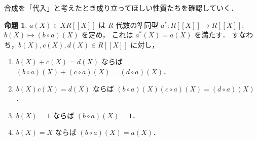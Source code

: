 \documentclass{jsarticle}
\newcommand{\longto}{\longrightarrow}
\theoremstyle{definition}
\newtheorem{Prp}{命題}
\newenvironment{prp}{\vspace{1ex}\begin{screen}\begin{Prp}}{\end{Prp}\end{screen}}
\begin{document}
合成を「代入」と考えたとき成り立ってほしい性質たちを確認していく．

\begin{prp}
  \label{prp:composition-hom}
  $a(X) \in X R[[X]]$ は $R$ 代数の準同型 $a^*\colon R[[X]] \longto R[[X]]$; $b(X) \longmapsto (b \circ a)(X)$ を定め，
  これは $a^*(X) = a(X)$ を満たす．
  すなわち，$b(X), c(X), d(X) \in R[[X]]$ に対し，
  \begin{enumerate}[(1)]
    \item $b(X) + c(X) = d(X)$ ならば $(b \circ a)(X) + (c \circ a)(X) = (d \circ a)(X)$．
    \item $b(X) c(X) = d(X)$ ならば $(b \circ a)(X) (c \circ a)(X) = (d \circ a)(X)$．
    \item $b(X) = 1$ ならば $(b \circ a)(X) = 1$．
    \item $b(X) = X$ ならば $(b \circ a)(X) = a(X)$．
  \end{enumerate}
\end{prp}
\end{document}
